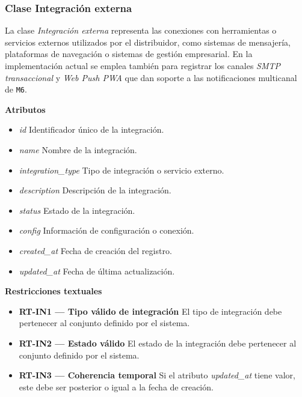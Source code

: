 \subsubsection{Clase Integración externa}

La clase \textit{Integración externa} representa las conexiones con herramientas o servicios externos utilizados por el distribuidor, como sistemas de mensajería, plataformas de navegación o sistemas de gestión empresarial. En la implementación actual se emplea también para registrar los canales \textit{SMTP transaccional} y \textit{Web Push PWA} que dan soporte a las notificaciones multicanal de \texttt{M6}.

\textbf{Atributos}

\begin{itemize}

      \item \textit{id}
            Identificador único de la integración.
      \item \textit{name}
            Nombre de la integración.
      \item \textit{integration\_type}
            Tipo de integración o servicio externo.
      \item \textit{description}
            Descripción de la integración.
      \item \textit{status}
            Estado de la integración.
      \item \textit{config}
            Información de configuración o conexión.
      \item \textit{created\_at}
            Fecha de creación del registro.
      \item \textit{updated\_at}
            Fecha de última actualización.

\end{itemize}

\textbf{Restricciones textuales}

\begin{itemize}

      \item \textbf{RT-IN1 — Tipo válido de integración}
            El tipo de integración debe pertenecer al conjunto definido por el sistema.
      \item \textbf{RT-IN2 — Estado válido}
            El estado de la integración debe pertenecer al conjunto definido por el sistema.
      \item \textbf{RT-IN3 — Coherencia temporal}
            Si el atributo \textit{updated\_at} tiene valor, este debe ser posterior o igual a la fecha de creación.

\end{itemize}

